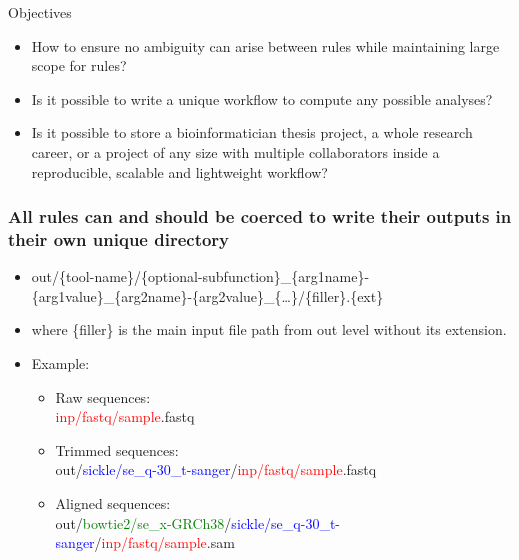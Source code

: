 \documentclass[10pt]{beamer}
\begin{document}
\begin{frame}{Objectives}
  \begin{itemize}
    \item How to ensure no ambiguity can arise between rules while maintaining large scope for rules?
    \item Is it possible to write a unique workflow to compute any possible analyses?
    \item Is it possible to store a bioinformatician thesis project, a whole research career, or a project of any size with multiple collaborators inside a reproducible, scalable and lightweight workflow?
  \end{itemize}
\end{frame}
\begin{frame}
  \frametitle{All rules can and should be coerced to write their outputs in their own unique directory}
  \begin{itemize}
    \item out/\{tool-name\}/\{optional-subfunction\}\_\{arg1name\}-\{arg1value\}\_\{arg2name\}-\{arg2value\}\_\{\ldots\}/\{filler\}.\{ext\}
    \item where \{filler\} is the main input file path from out level without its extension.
    \item Example:
      \begin{itemize}
        \item Raw sequences:\\
          \textcolor{red}{inp/fastq/sample}.fastq
        \item Trimmed sequences:\\
          out/\textcolor{blue}{sickle/se\_q-30\_t-sanger}/\textcolor{red}{inp/fastq/sample}.fastq
        \item Aligned sequences:\\
          out/\textcolor{green}{bowtie2/se\_x-GRCh38}/\textcolor{blue}{sickle/se\_q-30\_t-sanger}/\textcolor{red}{inp/fastq/sample}.sam
      \end{itemize}
  \end{itemize}
\end{frame}
\end{document}
